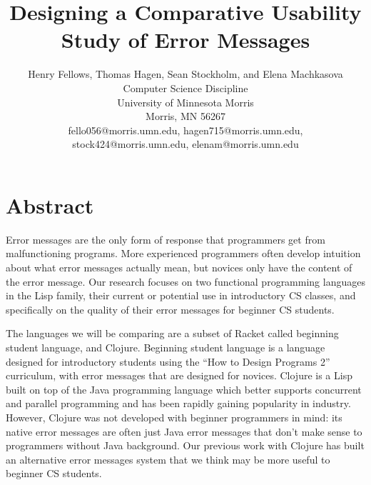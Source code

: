 \documentclass[12pt]{article}
\newcommand{\comment}[1]{{\bf \tt  {#1}}}
\begin{document}
\pagestyle{plain}
%

\title{Designing a Comparative Usability Study of Error Messages}
%
%

\author{
Henry Fellows, Thomas Hagen, Sean Stockholm, and Elena Machkasova \\
Computer Science Discipline \\
University of Minnesota Morris\\
Morris, MN 56267\\
fello056@morris.umn.edu, hagen715@morris.umn.edu,\\
stock424@morris.umn.edu, elenam@morris.umn.edu
}
\date{}
\maketitle
\thispagestyle{empty}

\section*{\centering Abstract}
Error messages are the only form of response that programmers get from malfunctioning programs. More experienced programmers often develop intuition about what error messages actually mean, but novices only have the content of the error message. Our research focuses on two functional programming languages in the Lisp family, their current or potential use in introductory CS classes, and specifically on the quality of their error messages for beginner CS students. 

The languages we will be comparing are a subset of Racket called beginning student language, and Clojure. Beginning student language is a language designed for introductory students using the “How to Design Programs 2” curriculum, with error messages that are designed for novices. Clojure is a Lisp built on top of the Java programming language which better supports concurrent and parallel programming and has been rapidly gaining popularity in industry. However, Clojure was not developed with beginner programmers in mind: its native error messages are often just Java error messages that don’t make sense to programmers without Java background. Our previous work with Clojure has built an alternative error messages system that we think may be more useful to beginner CS students. 
\end{document}
